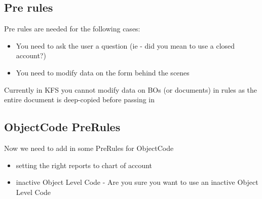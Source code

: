 \begin{ifhtml}
\begin{s5slide}
        \section{Pre rules}
            Pre rules are needed for the following cases:
            \begin{itemize}
                \item You need to ask the user a question (ie - did you mean to use a closed account?)
                \item You need to modify data on the form behind the scenes
            \end{itemize}
            Currently in KFS you cannot modify data on BOs (or documents) in rules as the entire document is deep-copied before passing in
    \end{s5slide}
    \begin{s5slide}
        \section{ObjectCode PreRules}
            Now we need to add in some PreRules for ObjectCode
            \begin{itemize}
                \item setting the right reports to chart of account
                \item inactive Object Level Code - Are you sure you want to use an inactive Object Level Code
            \end{itemize}
    \end{s5slide}
\end{ifhtml}